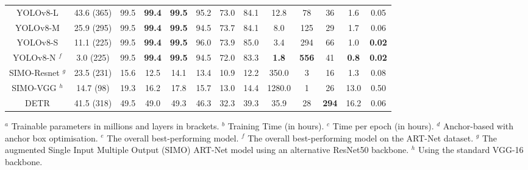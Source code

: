 \begin{table}[htbp]
\begin{tabular}{|c|c|c|c|c|c|c|c|c|c|c|c|c|}
    YOLOv8-L & 43.6 (365) & 99.5 & \textbf{99.4} & \textbf{99.5} & 95.2 & 73.0 & 84.1 & 12.8 & 78 & 36 & 1.6 & 0.05 \\ 
    YOLOv8-M & 25.9 (295) & 99.5 & \textbf{99.4} & \textbf{99.5} & 94.5 & 73.7 & 84.1 & 8.0 & 125 & 29 & 1.7 & 0.06 \\ 
    YOLOv8-S & 11.1 (225) & 99.5 & \textbf{99.4} & \textbf{99.5} & 96.0 & 73.9 & 85.0 & 3.4 & 294 & 66 & 1.0 & \textbf{0.02} \\ 
    \rowcolor{pink} YOLOv8-N $^f$ & 3.0 (225) & 99.5 & \textbf{99.4} & \textbf{99.5} & 94.5 & 72.0 & 83.3 & \textbf{1.8} & \textbf{556} & 41 & \textbf{0.8} & \textbf{0.02} \\ 
    SIMO-Resnet $^g$  & 23.5 (231) & 15.6 & 12.5 & 14.1 & 13.4 & 10.9 & 12.2 & 350.0 & 3 & 16 & 1.3 & 0.08 \\ 
    SIMO-VGG $^h$  & 14.7 (98) & 19.3 & 16.2 & 17.8 & 15.7 & 13.0 & 14.4 & 1280.0 & 1 & 26 & 13.0 & 0.50 \\ 
    DETR & 41.5 (318) & 49.5 & 49.0 & 49.3 & 46.3 & 32.3 & 39.3 & 35.9 & 28 & \textbf{294} & 16.2 & 0.06 \\
    \hline
\end{tabular}
\newline
\scriptsize{$^a$ Trainable parameters in millions and layers in brackets. $^b$ Training Time (in hours). $^c$ Time per epoch (in hours). $^d$ Anchor-based with anchor box optimisation. $^e$ The overall best-performing model. $^f$ The overall best-performing model on the ART-Net dataset. $^g$ The augmented Single Input Multiple Output (SIMO) ART-Net model using an alternative ResNet50 backbone. $^h$ Using the standard VGG-16 backbone.}
\vspace{-2.5mm}
\end{table}

